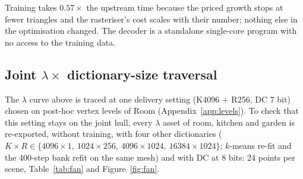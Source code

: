 \documentclass[11pt,a4paper]{article}
\begin{document}
Training takes $0.57\times$ the upstream time because the priced growth stops at fewer triangles and the rasteriser's cost scales with their number; nothing else in the optimisation changed. The decoder is a standalone single-core program with no access to the training data.

\subsection{Joint $\lambda \times$ dictionary-size traversal}
\label{sec:fan}

The $\lambda$ curve above is traced at one delivery setting (K4096 + R256, DC 7 bit) chosen on post-hoc vertex levels of Room (Appendix~\ref{app:levels}). To check that this setting stays on the joint hull, every $\lambda$ asset of room, kitchen and garden is re-exported, without training, with four other dictionaries ($K\times R \in \{4096\times1,\ 1024\times256,\ 4096\times1024,\ 16384\times1024\}$; $k$-means re-fit and the 400-step bank refit on the same mesh) and with DC at 8 bits: 24 points per scene, Table~\ref{tab:fan} and Figure~\ref{fig:fan}.
\end{document}
